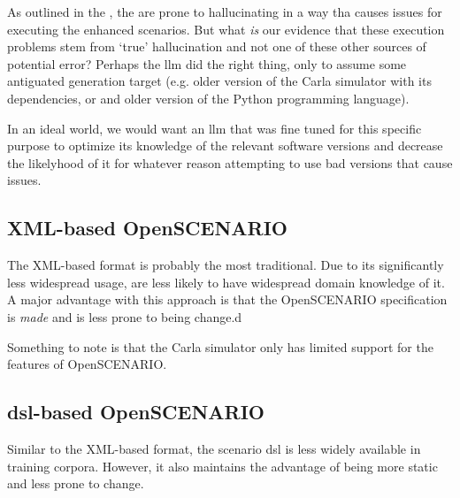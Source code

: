 As outlined in the , the  are prone to hallucinating in a way tha
causes issues for executing the enhanced scenarios. But what \emph{is} our evidence that these
execution problems stem from `true' hallucination and not one of these other sources of potential
error? Perhaps the \acrshort{llm} did the right thing, only to assume some antiguated generation
target (e.g. older version of the Carla simulator with its dependencies, or and older version of the
Python programming language).

In an ideal world, we would want an \acrshort{llm} that was fine tuned for this specific purpose to
optimize its knowledge of the relevant software versions and decrease the likelyhood of it for
whatever reason attempting to use bad versions that cause issues.

\subsection{XML-based OpenSCENARIO}

The XML-based format is probably the most traditional. Due to its significantly less widespread
usage,  are less likely to have widespread domain knowledge of it. A major advantage
with this approach is that the OpenSCENARIO specification is \emph{made} and is less prone to being
change.d

Something to note is that the Carla simulator only has limited support for the
features of OpenSCENARIO.

\subsection{\acrlong{dsl}-based OpenSCENARIO}

Similar to the XML-based format, the scenario \acrshort{dsl} is less widely available in training corpora. However, it also maintains the advantage of being more static and less prone to change.


